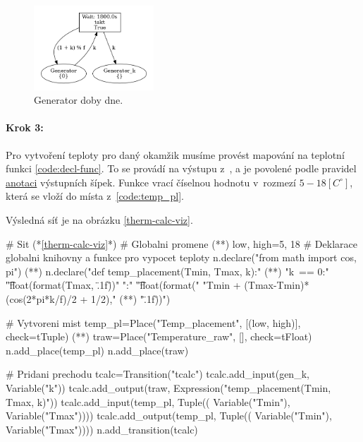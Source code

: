 \begin{figure}[htb]
 \centering
 \includegraphics[width=0.4\textwidth]{obrazky-figures/therm-gen.png}
 \caption{Generator doby dne.}
 \label{therm-gen-viz}
\end{figure}

\paragraph{Krok 3:}
Pro vytvoření teploty pro daný okamžik musíme provést mapování na teplotní funkci \ref{code:decl-func}. To se provádí na výstupu z~, a je povolené podle pravidel \href{https://www.ibisc.univ-evry.fr/~fpommereau/SNAKES/understanding-transition-firing.html}{anotaci} výstupních šípek. Funkce vrací číselnou hodnotu v~rozmezí $5-18\left[C^{\circ}\right]$, která se vloží do místa  z~\ref{code:temp_pl}.

Výsledná síť je na obrázku \ref{therm-calc-viz}.

\begin{python}
 # Sit (*\ref{therm-calc-viz}*)
 # Globalni promene (*\label{code:therm-calc-draw}*)
 low, high=5, 18
 # Deklarace globalni knihovny a funkce pro vypocet teploty
 n.declare("from math import cos, pi") (*\label{code:decl-libs}*)
 n.declare("def temp_placement(Tmin, Tmax, k):" (*\label{code:decl-func}*)
 "\n\tif k~== 0:"
 "\n\t\treturn float(format(Tmax, \".1f\"))"
 "\n\telse:"
 "\n\t\treturn float(format("
 "Tmin + (Tmax-Tmin)*(cos(2*pi*k/f)/2 + 1/2)," (*\label{code:lib-import-usage}*)
 "\".1f\"))")

 # Vytvoreni mist
 temp_pl=Place("Temp_placement", [(low, high)], check=tTuple) (*\label{code:temp_pl}*)
 traw=Place("Temperature_raw", [], check=tFloat)
 n.add_place(temp_pl)
 n.add_place(traw)

 # Pridani prechodu
 tcalc=Transition("tcalc")
 tcalc.add_input(gen_k, Variable("k"))
 tcalc.add_output(traw, Expression("temp_placement(Tmin, Tmax, k)"))
 tcalc.add_input(temp_pl, Tuple((
   Variable("Tmin"), Variable("Tmax"))))
 tcalc.add_output(temp_pl, Tuple((
   Variable("Tmin"), Variable("Tmax"))))
 n.add_transition(tcalc)
\end{python}

